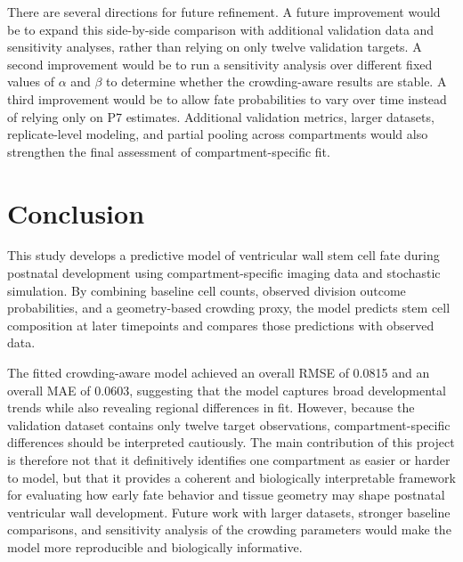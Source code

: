 \documentclass[12pt]{article}
\begin{document}
There are several directions for future refinement. A future improvement would be to expand this side-by-side comparison with additional validation data and sensitivity analyses, rather than relying on only twelve validation targets. A second improvement would be to run a sensitivity analysis over different fixed values of $\alpha$ and $\beta$ to determine whether the crowding-aware results are stable. A third improvement would be to allow fate probabilities to vary over time instead of relying only on P7 estimates. Additional validation metrics, larger datasets, replicate-level modeling, and partial pooling across compartments would also strengthen the final assessment of compartment-specific fit.

\section{Conclusion}

This study develops a predictive model of ventricular wall stem cell fate during postnatal development using compartment-specific imaging data and stochastic simulation. By combining baseline cell counts, observed division outcome probabilities, and a geometry-based crowding proxy, the model predicts stem cell composition at later timepoints and compares those predictions with observed data.

The fitted crowding-aware model achieved an overall RMSE of 0.0815 and an overall MAE of 0.0603, suggesting that the model captures broad developmental trends while also revealing regional differences in fit. However, because the validation dataset contains only twelve target observations, compartment-specific differences should be interpreted cautiously. The main contribution of this project is therefore not that it definitively identifies one compartment as easier or harder to model, but that it provides a coherent and biologically interpretable framework for evaluating how early fate behavior and tissue geometry may shape postnatal ventricular wall development. Future work with larger datasets, stronger baseline comparisons, and sensitivity analysis of the crowding parameters would make the model more reproducible and biologically informative.
\end{document}

